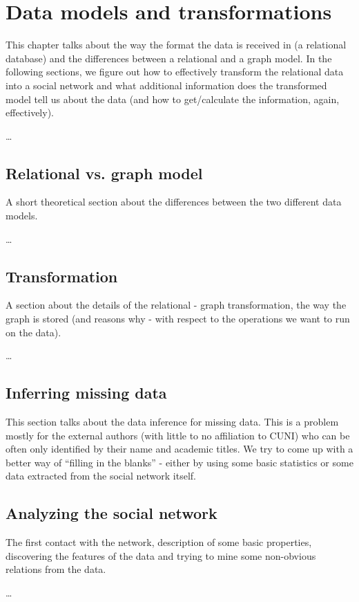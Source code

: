 \chapter{Data models and transformations}

This chapter talks about the way the format the data is received in (a relational database) and the differences between a relational and a graph model. In the following sections, we figure out how to effectively transform the relational data into a social network and what additional information does the transformed model tell us about the data (and how to get/calculate the information, again, effectively).  

\dots

\section{Relational vs. graph model}

A short theoretical section about the differences between the two different data models.

\dots

\section{Transformation}

A section about the details of the relational - graph transformation, the way the graph is stored (and reasons why - with respect to the operations we want to run on the data).

\dots

\section{Inferring missing data}

This section talks about the data inference for missing data. This is a problem mostly for the external authors (with little to no affiliation to CUNI) who can be often only identified by their name and academic titles. We try to come up with a better way of ``filling in the blanks'' - either by using some basic statistics or some data extracted from the social network itself.

\section{Analyzing the social network}

The first contact with the network, description of some basic properties, discovering the features of the data and trying to mine some non-obvious relations from the data.

\dots